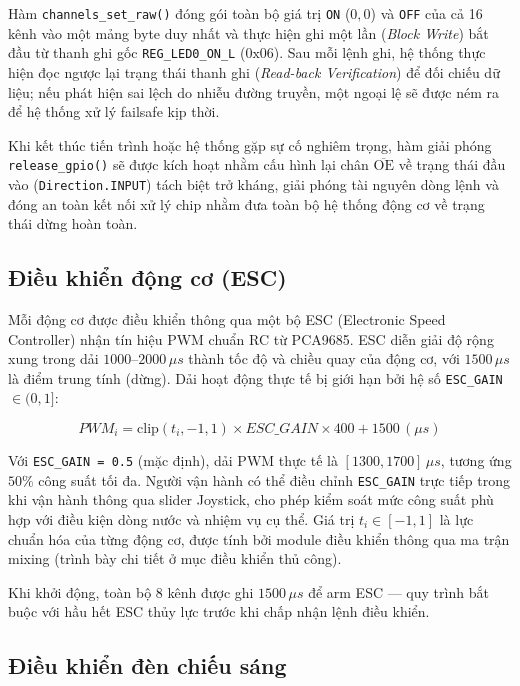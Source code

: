 \documentclass[../DoAn.tex]{subfiles}
\begin{document}
Hàm \texttt{channels\_set\_raw()} đóng gói toàn bộ giá trị \texttt{ON} ($0, 0$) và \texttt{OFF} của cả 16 kênh vào một mảng byte duy nhất và thực hiện ghi một lần (\textit{Block Write}) bắt đầu từ thanh ghi gốc \texttt{REG\_LED0\_ON\_L} ($0\text{x06}$). Sau mỗi lệnh ghi, hệ thống thực hiện đọc ngược lại trạng thái thanh ghi (\textit{Read-back Verification}) để đối chiếu dữ liệu; nếu phát hiện sai lệch do nhiễu đường truyền, một ngoại lệ sẽ được ném ra để hệ thống xử lý failsafe kịp thời.

Khi kết thúc tiến trình hoặc hệ thống gặp sự cố nghiêm trọng, hàm giải phóng \texttt{release\_gpio()} sẽ được kích hoạt nhằm cấu hình lại chân $\overline{\text{OE}}$ về trạng thái đầu vào (\texttt{Direction.INPUT}) tách biệt trở kháng, giải phóng tài nguyên dòng lệnh và đóng an toàn kết nối xử lý chip nhằm đưa toàn bộ hệ thống động cơ về trạng thái dừng hoàn toàn.
\subsection{Điều khiển động cơ (ESC)}

Mỗi động cơ được điều khiển thông qua một bộ ESC (Electronic Speed
Controller) nhận tín hiệu PWM chuẩn RC từ PCA9685. ESC diễn giải độ
rộng xung trong dải $1000$--$2000\,\mu s$ thành tốc độ và chiều quay
của động cơ, với $1500\,\mu s$ là điểm trung tính (dừng). Dải hoạt
động thực tế bị giới hạn bởi hệ số \texttt{ESC\_GAIN} $\in (0, 1]$:

\begin{equation}
    PWM_i = \text{clip}(t_i, -1, 1) \times ESC\_GAIN \times 400 + 1500\,(\mu s)
\end{equation}

Với \texttt{ESC\_GAIN = 0.5} (mặc định), dải PWM thực tế là
$[1300, 1700]\,\mu s$, tương ứng $50\%$ công suất tối đa. Người vận
hành có thể điều chỉnh \texttt{ESC\_GAIN} trực tiếp trong khi vận hành
thông qua slider Joystick, cho phép kiểm soát mức công suất phù hợp
với điều kiện dòng nước và nhiệm vụ cụ thể. Giá trị $t_i \in [-1, 1]$
là lực chuẩn hóa của từng động cơ, được tính bởi module điều khiển
thông qua ma trận mixing (trình bày chi tiết ở mục điều khiển thủ
công).

Khi khởi động, toàn bộ 8 kênh được ghi $1500\,\mu s$ để arm ESC ---
quy trình bắt buộc với hầu hết ESC thủy lực trước khi chấp nhận lệnh
điều khiển.

\subsection{Điều khiển đèn chiếu sáng}
\end{document}
